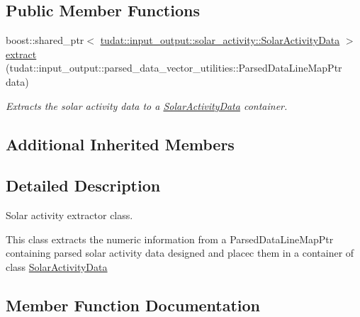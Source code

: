 \subsection*{Public Member Functions}
\begin{DoxyCompactItemize}
\item 
boost\+::shared\+\_\+ptr$<$ \hyperlink{structtudat_1_1input__output_1_1solar__activity_1_1SolarActivityData}{tudat\+::input\+\_\+output\+::solar\+\_\+activity\+::\+Solar\+Activity\+Data} $>$ \hyperlink{classtudat_1_1input__output_1_1solar__activity_1_1ExtractSolarActivityData_a6632403124ae795fa571790c6b8ab3a0}{extract} (tudat\+::input\+\_\+output\+::parsed\+\_\+data\+\_\+vector\+\_\+utilities\+::\+Parsed\+Data\+Line\+Map\+Ptr data)
\begin{DoxyCompactList}\small\item\em Extracts the solar activity data to a \hyperlink{structtudat_1_1input__output_1_1solar__activity_1_1SolarActivityData}{Solar\+Activity\+Data} container. \end{DoxyCompactList}\end{DoxyCompactItemize}
\subsection*{Additional Inherited Members}


\subsection{Detailed Description}
Solar activity extractor class. 

This class extracts the numeric information from a Parsed\+Data\+Line\+Map\+Ptr containing parsed solar activity data designed and placec them in a container of class \hyperlink{structtudat_1_1input__output_1_1solar__activity_1_1SolarActivityData}{Solar\+Activity\+Data} 

\subsection{Member Function Documentation}
